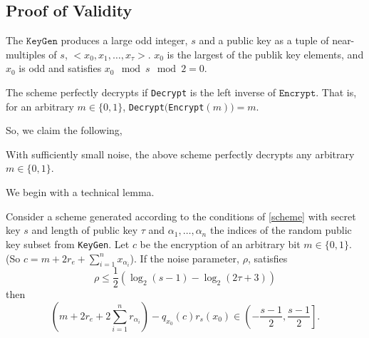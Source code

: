 \documentclass[a4paper,11pt, oneside]{article}
\begin{document}
\subsection{Proof of Validity}\label{sec:proof}
The $\texttt{KeyGen}$ produces a large odd integer, $s$ and a public key as a tuple of near-multiples of $s$, $<x_0,x_1,\dots,x_\tau>$.  $x_0$ is the largest of the publik key elements, and $x_0$ is odd and satisfies $x_0\mod{s}\mod{2} = 0$.


The scheme perfectly decrypts if \texttt{Decrypt} is the left inverse of $\texttt{Encrypt}$.  That is, for an arbitrary $m\in\{0,1\}$, \texttt{Decrypt}$($\texttt{Encrypt}$(m)) = m$.

So, we claim the following,
\begin{theorem}
    With sufficiently small noise, the above scheme perfectly decrypts any arbitrary $m\in\{0,1\}$.
    \label{perfect}
\end{theorem}

We begin with a technical lemma.
\begin{lemma}
    Consider a scheme generated according to the conditions of \ref{scheme} with secret key $s$ and length of public key $\tau$ and $\alpha_1,\dots,\alpha_n$ the indices of the random public key subset from \texttt{KeyGen}.  Let $c$ be the encryption of an arbitrary bit $m\in\{0,1\}$. (So $c = m + 2r_e + \sum_{i=1}^n x_{\alpha_i}$).
    If the noise parameter, $\rho$, satisfies 
    \[\rho \leq \frac{1}{2}\left( \log_2(s-1) - \log_2(2\tau+3)\right)\]
    then 
    \[
        \left(m + 2r_e + 2\sum_{i=1}^n r_{\alpha_i}\right) - q_{x_0}(c)r_s(x_0) \in \left(-\frac{s-1}{2}, \frac{s-1}{2}\right].\]
    \label{bound}
\end{lemma}
\end{document}
